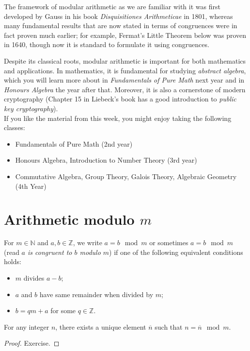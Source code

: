 \documentclass[11pt,dvipsnames]{book}
\numberwithin{equation}{section} %
\numberwithin{figure}{section} %
\numberwithin{table}{section} %
\begin{document}
The framework of modular arithmetic as we are familiar with it was first developed by Gauss in his book {\it  Disquisitiones Arithmeticae} in 1801, whereas many fundamental results that are now stated in terms of congruences were in fact proven much earlier; for example, Fermat's Little Theorem below was proven in 1640, though now it is standard to formulate it using congruences. 

Despite its classical roots, modular arithmetic is important for both mathematics and applications. In mathematics, it is fundamental for studying {\it abstract algebra}, which you will learn more about in {\it Fundamentals of Pure Math} next year and in {\it Honours Algebra} the year after that. Moreover, it is also a cornerstone of modern cryptography (Chapter 15 in Liebeck's book has a good introduction to {\it public key cryptography}). \\

If you like the material from this week, you might enjoy taking the following classes:

\begin{itemize}
\item Fundamentals of Pure Math (2nd year)
\item Honours Algebra, Introduction to Number Theory (3rd year)
\item Commutative Algebra, Group Theory, Galois Theory, Algebraic Geometry (4th Year)
\end{itemize}

\section{Arithmetic modulo $m$}

\begin{definition}
\label{d:mod}
For $m\in \mathbb{N}$ and $a,b\in \mathbb{Z}$, we write $a = b\mod m$ or sometimes $a  = b\mod m$ (read {\it $a$ is congruent to $b$ modulo $m$}) if one of the following equivalent conditions holds:
 
\begin{itemize}
\item $m$ divides $a-b$;
\item $a$ and $b$ have same remainder when divided by $m$;
\item $b=qm+a$ for some $q\in \mathbb{Z}$.
\end{itemize}
\end{definition}

\begin{proposition}
For any integer $n$, there exists a unique element $\overline{n}$ such that $n = \overline{n} \mod m$.
\end{proposition}
\begin{proof}
Exercise.
\end{proof}
\end{document}
